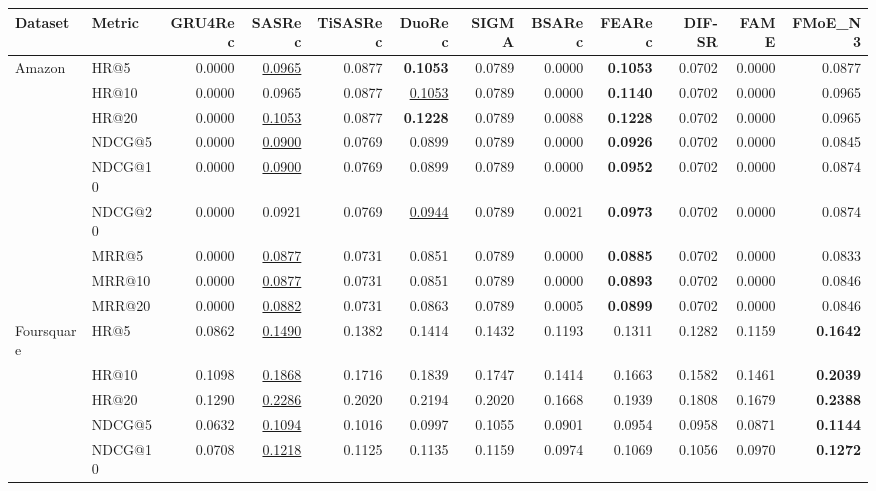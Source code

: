 \begin{tabular}{llrrrrrrrrrr}
\hline
Dataset & Metric & GRU4Rec & SASRec & TiSASRec & DuoRec & SIGMA & BSARec & FEARec & DIF-SR & FAME & FMoE\_N3 \\
\hline
Amazon & HR@5 & 0.0000 & \underline{0.0965} & 0.0877 & \textbf{0.1053} & 0.0789 & 0.0000 & \textbf{0.1053} & 0.0702 & 0.0000 & 0.0877 \\
 & HR@10 & 0.0000 & 0.0965 & 0.0877 & \underline{0.1053} & 0.0789 & 0.0000 & \textbf{0.1140} & 0.0702 & 0.0000 & 0.0965 \\
 & HR@20 & 0.0000 & \underline{0.1053} & 0.0877 & \textbf{0.1228} & 0.0789 & 0.0088 & \textbf{0.1228} & 0.0702 & 0.0000 & 0.0965 \\
 & NDCG@5 & 0.0000 & \underline{0.0900} & 0.0769 & 0.0899 & 0.0789 & 0.0000 & \textbf{0.0926} & 0.0702 & 0.0000 & 0.0845 \\
 & NDCG@10 & 0.0000 & \underline{0.0900} & 0.0769 & 0.0899 & 0.0789 & 0.0000 & \textbf{0.0952} & 0.0702 & 0.0000 & 0.0874 \\
 & NDCG@20 & 0.0000 & 0.0921 & 0.0769 & \underline{0.0944} & 0.0789 & 0.0021 & \textbf{0.0973} & 0.0702 & 0.0000 & 0.0874 \\
 & MRR@5 & 0.0000 & \underline{0.0877} & 0.0731 & 0.0851 & 0.0789 & 0.0000 & \textbf{0.0885} & 0.0702 & 0.0000 & 0.0833 \\
 & MRR@10 & 0.0000 & \underline{0.0877} & 0.0731 & 0.0851 & 0.0789 & 0.0000 & \textbf{0.0893} & 0.0702 & 0.0000 & 0.0846 \\
 & MRR@20 & 0.0000 & \underline{0.0882} & 0.0731 & 0.0863 & 0.0789 & 0.0005 & \textbf{0.0899} & 0.0702 & 0.0000 & 0.0846 \\
\hline
Foursquare & HR@5 & 0.0862 & \underline{0.1490} & 0.1382 & 0.1414 & 0.1432 & 0.1193 & 0.1311 & 0.1282 & 0.1159 & \textbf{0.1642} \\
 & HR@10 & 0.1098 & \underline{0.1868} & 0.1716 & 0.1839 & 0.1747 & 0.1414 & 0.1663 & 0.1582 & 0.1461 & \textbf{0.2039} \\
 & HR@20 & 0.1290 & \underline{0.2286} & 0.2020 & 0.2194 & 0.2020 & 0.1668 & 0.1939 & 0.1808 & 0.1679 & \textbf{0.2388} \\
 & NDCG@5 & 0.0632 & \underline{0.1094} & 0.1016 & 0.0997 & 0.1055 & 0.0901 & 0.0954 & 0.0958 & 0.0871 & \textbf{0.1144} \\
 & NDCG@10 & 0.0708 & \underline{0.1218} & 0.1125 & 0.1135 & 0.1159 & 0.0974 & 0.1069 & 0.1056 & 0.0970 & \textbf{0.1272} \\

\end{tabular}
